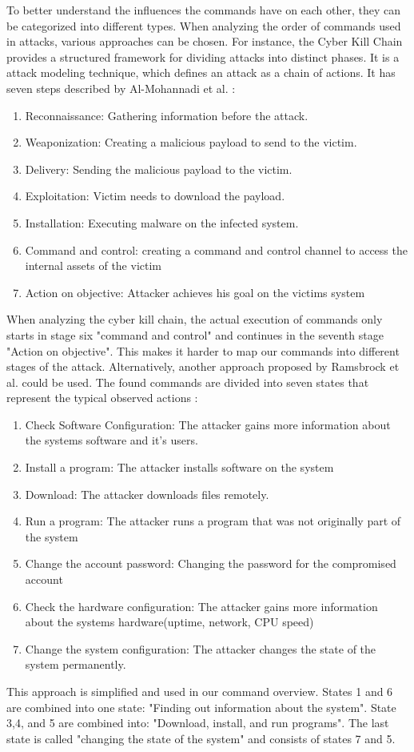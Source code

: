 To better understand the influences the commands have on each other, they can be categorized into different types. 
When analyzing the order of commands used in attacks, various approaches can be chosen. 
For instance, the Cyber Kill Chain provides a structured framework for dividing attacks into distinct phases. It is a attack modeling technique, which defines an attack as a chain of actions. It has seven steps described by Al-Mohannadi et al. \cite{7592703}:
\begin{enumerate}
    \item Reconnaissance: Gathering information before the attack.
    \item Weaponization: Creating a malicious payload to send to the victim. 
    \item Delivery: Sending the malicious payload to the victim.
    \item Exploitation: Victim needs to download the payload. 
    \item Installation: Executing malware on the infected system. 
    \item Command and control: creating a command and control channel to access the internal assets of the victim
    \item  Action on objective: Attacker achieves his goal on the victims system
\end{enumerate}
When analyzing the cyber kill chain, the actual execution of commands only starts in stage six "command and control" and continues in the seventh stage "Action on objective". This makes it harder to map our commands into different stages of the attack.
Alternatively, another approach proposed by Ramsbrock et al. could be used. The found commands are divided into seven states that represent the typical observed actions \cite{4272962}:
\begin{enumerate}
    \item Check Software Configuration:  The attacker gains more information about the systems software and it's users.
    \item Install a program: The attacker installs software on the system
    \item Download: The attacker downloads files remotely.
    \item Run a program: The attacker runs a program that was not originally part of the system 
    \item Change the account password: Changing the password for the compromised account  
    \item Check the hardware configuration: The attacker gains more information about the systems hardware(uptime, network, CPU speed)
    \item Change the system configuration: The attacker changes the state of the system permanently.
\end{enumerate}
This approach is simplified and used in our command overview. States 1 and 6 are combined into one state: "Finding out information about the system". State 3,4, and 5 are combined into: "Download, install, and run programs". The last state is called "changing the state of the system" and consists of states 7 and 5. 




